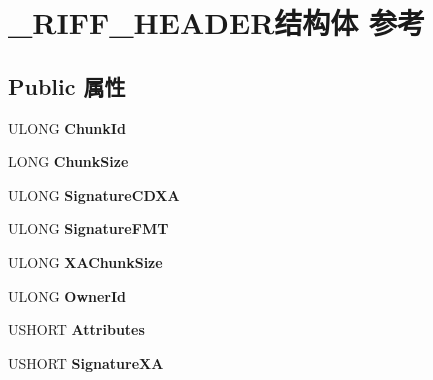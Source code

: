 \hypertarget{struct___r_i_f_f___h_e_a_d_e_r}{}\section{\+\_\+\+R\+I\+F\+F\+\_\+\+H\+E\+A\+D\+E\+R结构体 参考}
\label{struct___r_i_f_f___h_e_a_d_e_r}
\subsection*{Public 属性}
\begin{DoxyCompactItemize}
\item 
\mbox{\label{struct___r_i_f_f___h_e_a_d_e_r_a8fee2a56527f61a9b8576dfd19ac49d4}} 
U\+L\+O\+NG {\bfseries Chunk\+Id}
\item 
\mbox{\label{struct___r_i_f_f___h_e_a_d_e_r_aaf6a9c4f54cee6bf054f6eb26e3a9abf}} 
L\+O\+NG {\bfseries Chunk\+Size}
\item 
\mbox{\label{struct___r_i_f_f___h_e_a_d_e_r_a0135af4c76f9697089898c750aad426e}} 
U\+L\+O\+NG {\bfseries Signature\+C\+D\+XA}
\item 
\mbox{\label{struct___r_i_f_f___h_e_a_d_e_r_a7b45e34642197d37a730ef6a0f4d3056}} 
U\+L\+O\+NG {\bfseries Signature\+F\+MT}
\item 
\mbox{\label{struct___r_i_f_f___h_e_a_d_e_r_af7cb61af4106375260c663f6bd5a4c39}} 
U\+L\+O\+NG {\bfseries X\+A\+Chunk\+Size}
\item 
\mbox{\label{struct___r_i_f_f___h_e_a_d_e_r_a4ff16662dfafa8ded88deb9f1ebd6881}} 
U\+L\+O\+NG {\bfseries Owner\+Id}
\item 
\mbox{\label{struct___r_i_f_f___h_e_a_d_e_r_a51ae700ff33eb015c0823ffc8507c0f7}} 
U\+S\+H\+O\+RT {\bfseries Attributes}
\item 
\mbox{\label{struct___r_i_f_f___h_e_a_d_e_r_a07f99de47a543783350c52f58c31ec83}} 
U\+S\+H\+O\+RT {\bfseries Signature\+XA}

\end{DoxyCompactItemize}
